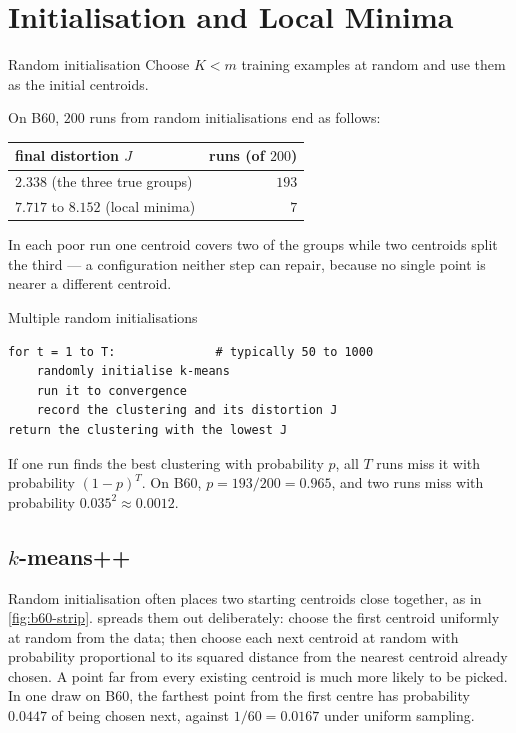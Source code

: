 \section{Initialisation and Local Minima}
\label{sec:km-init}

\begin{defbox}{Random initialisation}
Choose $K < m$ training examples at random and use them as the initial
centroids.
\end{defbox}

On B60, $200$ runs from random initialisations end as follows:

\begin{center}
\small
\renewcommand{\arraystretch}{1.12}
\begin{tabular}{@{}lr@{}}
\toprule
final distortion $J$ & runs (of $200$)\\
\midrule
$2.338$ (the three true groups)  & $193$\\
$7.717$ to $8.152$ (local minima) & $7$\\
\bottomrule
\end{tabular}
\end{center}

In each poor run one centroid covers two of the groups while two centroids split
the third --- a configuration neither step can repair, because no single point is
nearer a different centroid.

\begin{algorithmbox}{Multiple random initialisations}
\begin{lstlisting}[style=pseudocode]
for t = 1 to T:              # typically 50 to 1000
    randomly initialise k-means
    run it to convergence
    record the clustering and its distortion J
return the clustering with the lowest J
\end{lstlisting}
If one run finds the best clustering with probability $p$, all $T$ runs miss it
with probability $(1-p)^T$. On B60, $p = 193/200 = 0.965$, and two runs miss with
probability $0.035^2 \approx 0.0012$.
\end{algorithmbox}

\subsection{\texorpdfstring{$k$}{k}-means++}

Random initialisation often places two starting centroids close together, as in
\cref{fig:b60-strip}.  spreads them out deliberately: choose
the first centroid uniformly at random from the data; then choose each next
centroid at random with probability proportional to its squared distance from the
nearest centroid already chosen. A point far from every existing centroid is
much more likely to be picked. In one draw on B60, the farthest point from the
first centre has probability $0.0447$ of being chosen next, against $1/60 =
0.0167$ under uniform sampling.

